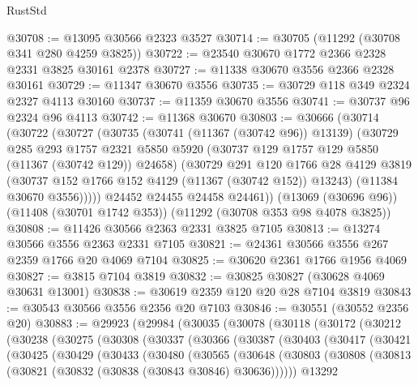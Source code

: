 \begin{lexlean}{RustStd}
\begin{coremodule}
@30708 := @13095 @30566 @2323 @3527
@30714 := @30705 (@11292 (@30708 @341 @280 @4259 @3825))
@30722 := @23540 @30670 @1772 @2366 @2328 @2331 @3825 @30161 @2378
@30727 := @11338 @30670 @3556 @2366 @2328 @30161
@30729 := @11347 @30670 @3556
@30735 := @30729 @118 @349 @2324 @2327 @4113 @30160
@30737 := @11359 @30670 @3556
@30741 := @30737 @96 @2324 @96 @4113
@30742 := @11368 @30670
@30803 := @30666
    (@30714
      (@30722
        (@30727
          (@30735
            (@30741 (@11367 (@30742 @96)) @13139)
            (@30729
              @285
              @293
              @1757
              @2321
              @5850
              @5920
              (@30737 @129 @1757 @129 @5850 (@11367 (@30742 @129)) @24658)
              (@30729
                @291
                @120
                @1766
                @28
                @4129
                @3819
                (@30737 @152 @1766 @152 @4129 (@11367 (@30742 @152)) @13243)
                (@11384 @30670 @3556)))))
        @24452
        @24455
        @24458
        @24461))
    (@13069 (@30696 @96))
    (@11408 (@30701 @1742 @353))
    (@11292 (@30708 @353 @98 @4078 @3825))
@30808 := @11426 @30566 @2363 @2331 @3825 @7105
@30813 := @13274 @30566 @3556 @2363 @2331 @7105
@30821 := @24361 @30566 @3556 @267 @2359 @1766 @20 @4069 @7104
@30825 := @30620 @2361 @1766 @1956 @4069
@30827 := @3815 @7104 @3819
@30832 := @30825 @30827 (@30628 @4069 @30631 @13001)
@30838 := @30619 @2359 @120 @20 @28 @7104 @3819
@30843 := @30543 @30566 @3556 @2356 @20 @7103
@30846 := @30551 (@30552 @2356 @20)
@30883 := @29923
    (@29984
      (@30035
        (@30078
          (@30118
            (@30172
              (@30212
                (@30238
                  (@30275
                    (@30308
                      (@30337
                        (@30366
                          (@30387
                            (@30403
                              (@30417
                                (@30421
                                  (@30425
                                    (@30429
                                      (@30433
                                        (@30480
                                          (@30565
                                            (@30648
                                              (@30803
                                                (@30808
                                                  (@30813
                                                    (@30821
                                                      (@30832 (@30838 (@30843 @30846) @30636))))))
                                              @13292

\end{coremodule}
\end{lexlean}

